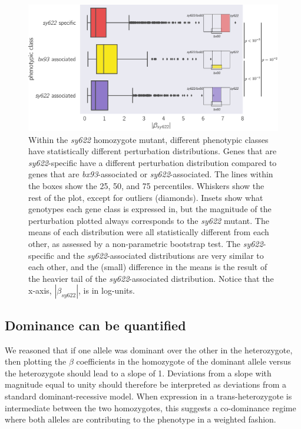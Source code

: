 \documentclass[10pt, onecolumn]{article}
\begin{document}
\begin{figure}
  \centering{}
  \includegraphics[width=.7\textwidth]{../figs/dpy22_classes.pdf}
  \caption{
    Within the \emph{sy622} homozygote mutant, different phenotypic classes have
    statistically different perturbation distributions. Genes that are
    \emph{sy622}-specific have a different perturbation distribution compared to
    genes that are \emph{bx93}-associated or \emph{sy622}-associated. The lines
    within the boxes show the 25, 50, and 75 percentiles. Whiskers show the rest
    of the plot, except for outliers (diamonds). Insets show what genotypes each
    gene class is expressed in, but the magnitude of the perturbation plotted
    always corresponds to the \emph{sy622} mutant. The means of each
    distribution were all statistically different from each other, as assessed
    by a non-parametric bootstrap test. The \emph{sy622}-specific and the
    \emph{sy622}-associated distributions are very similar to each other, and
    the (small) difference in the means is the result of the heavier tail of the
    \emph{sy622}-associated distribution. Notice that the x-axis,
    $|\beta_{sy622}|$, is in log-units.
  }
\label{fig:classes}
\end{figure}

\subsection*{Dominance can be quantified}
We reasoned that if one allele was dominant over the other in the heterozygote,
then plotting the $\beta$ coefficients in the homozygote of the dominant allele
versus the heterozygote should lead to a slope of 1. Deviations from a slope
with magnitude equal to unity should therefore be interpreted as deviations from
a standard dominant-recessive model. When expression in a trans-heterozygote
is intermediate between the two homozygotes, this suggests a co-dominance regime
where both alleles are contributing to the phenotype in a weighted fashion.
\end{document}
